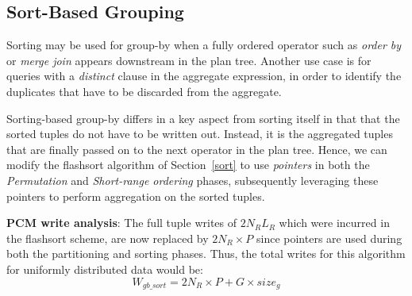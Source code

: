 \subsection{Sort-Based Grouping}

Sorting may be used for group-by when a fully ordered operator such
as \textit{order by} or \textit{merge join} appears downstream in the plan
tree. Another use case is for queries with a \textit{distinct} clause
in the aggregate expression, in order to identify the duplicates that have
to be discarded from the aggregate.  

Sorting-based group-by differs in a key aspect from sorting itself
in that that the sorted tuples do not have to be written out. Instead, it
is the aggregated tuples that are finally passed on to the next operator
in the plan tree. Hence, we can modify the flashsort algorithm of
Section~\ref{sort} to use \emph{pointers} in both the
\textit{Permutation} and \textit{Short-range ordering} phases, subsequently leveraging these
pointers to perform aggregation on the sorted tuples. 

\textbf{PCM write analysis}: The full tuple writes of $2 N_R L_R$
which were incurred in the flashsort scheme, are
now replaced by $2N_R \times P$ since pointers are used during
both the partitioning and sorting phases. Thus, the total writes for this
algorithm for uniformly distributed data would be:
\begin{equation}
\label{eq:gb_sort}
W_{gb\_sort} = 2N_R \times P + G \times size_g
\end{equation}
